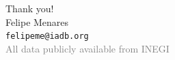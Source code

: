 \documentclass[aspectratio=169,usenames,dvipsnames]{beamer}
\begin{document}
\begin{frame}
\begin{center}
\Huge{\color{Blue}Thank you!} \\[12pt]
\small{
  Felipe Menares \\
  \texttt{felipeme@iadb.org} \\[8pt]
  \textcolor{gray}{All data publicly available from INEGI}
}
\end{center}
\end{frame}

{\tiny}
\end{document}
